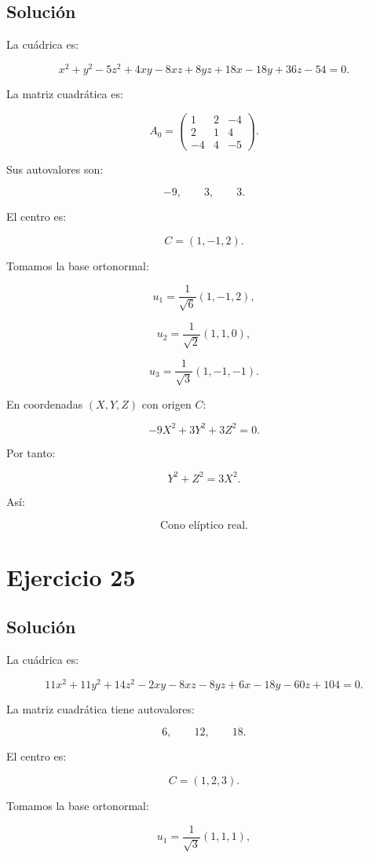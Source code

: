 \documentclass[11pt,a4paper]{article}
\begin{document}
\subsection{Solución}

La cuádrica es:

\[
x^2+y^2-5z^2+4xy-8xz+8yz
+18x-18y+36z-54=0.
\]

La matriz cuadrática es:

\[
A_0=
\begin{pmatrix}
1&2&-4\\
2&1&4\\
-4&4&-5
\end{pmatrix}.
\]

Sus autovalores son:

\[
-9,
\qquad
3,
\qquad
3.
\]

El centro es:

\[
\boxed{
C=(1,-1,2).
}
\]

Tomamos la base ortonormal:

\[
u_1=
\frac1{\sqrt6}(1,-1,2),
\]

\[
u_2=
\frac1{\sqrt2}(1,1,0),
\]

\[
u_3=
\frac1{\sqrt3}(1,-1,-1).
\]

En coordenadas \((X,Y,Z)\) con origen \(C\):

\[
-9X^2+3Y^2+3Z^2=0.
\]

Por tanto:

\[
\boxed{
Y^2+Z^2=3X^2.
}
\]

Así:

\[
\boxed{\text{Cono elíptico real}.}
\]

\section{Ejercicio 25}
\subsection{Solución}

La cuádrica es:

\[
11x^2+11y^2+14z^2
-2xy-8xz-8yz
+6x-18y-60z+104=0.
\]

La matriz cuadrática tiene autovalores:

\[
6,
\qquad
12,
\qquad
18.
\]

El centro es:

\[
\boxed{
C=(1,2,3).
}
\]

Tomamos la base ortonormal:

\[
u_1=
\frac1{\sqrt3}(1,1,1),
\]
\end{document}
